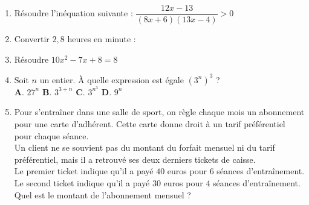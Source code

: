 \documentclass[a4paper,11pt]{article}
\begin{document}
\begin{seance}{} %

\begin{enumerate}
\item Résoudre l'inéquation suivante : $\dfrac{12x-13}{(8x+6)(13x-4)} > 0$ \dotfill

\dotfill

\dotfill


\item Convertir $2{,}8$ heures en minute : \dotfill



\item Résoudre $10x^2-7x+8=8$ \dotfill

\dotfill



\item Soit $n$ un entier. À quelle expression est égale $\left(3^n\right)^{3}$ ? \\

\textbf{A}. $27^{n}$ \quad \textbf{B}. $3^{3+n}$ \quad \textbf{C}. $3^{n^{3}}$ \quad \textbf{D}. $9^{n}$



\item Pour s'entraîner dans une salle de sport, on règle chaque mois un abonnement pour une carte d'adhérent. Cette carte donne droit à un tarif préférentiel pour chaque séance. \\
Un client ne se souvient pas du montant du forfait mensuel ni du tarif préférentiel, mais il a retrouvé ses deux derniers tickets de caisse. \\
Le premier ticket indique qu'il a payé $40$ euros pour $6$ séances d'entraînement.\\
 Le second ticket indique qu'il a payé $30$ euros pour $4$ séances d'entraînement. \\
Quel est le montant de l'abonnement mensuel ? \dotfill

\end{enumerate}

\end{seance}
\end{document}
